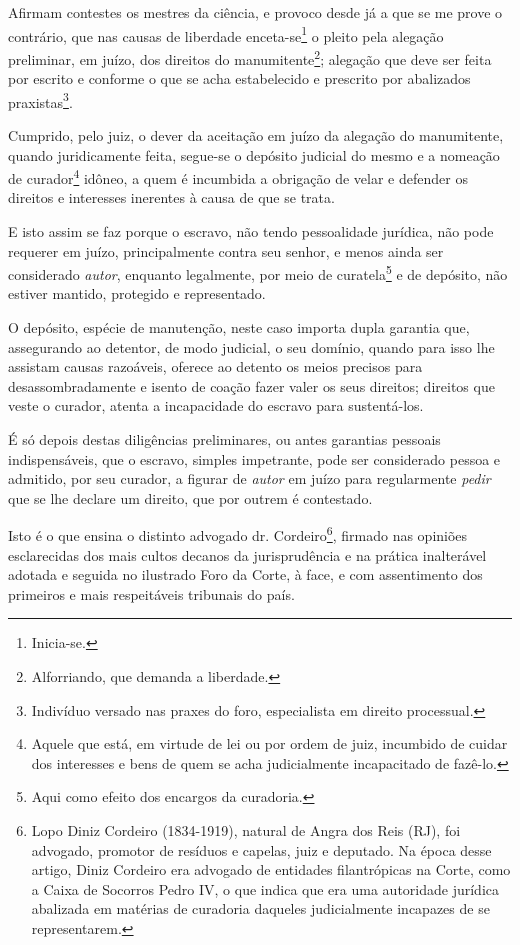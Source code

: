 \asterisc{}

Afirmam contestes os mestres da ciência, e provoco desde já a que se me
prove o contrário, que nas causas de liberdade enceta-se\footnote{
  Inicia-se.} o pleito pela alegação preliminar, em juízo, dos direitos
do manumitente\footnote{Alforriando, que demanda a liberdade.};
alegação que deve ser feita por escrito e conforme o que se acha
estabelecido e prescrito por abalizados praxistas\footnote{Indivíduo
  versado nas praxes do foro, especialista em direito processual.}.

Cumprido, pelo juiz, o dever da aceitação em juízo da alegação do
manumitente, quando juridicamente feita, segue-se o depósito judicial do
mesmo e a nomeação de curador\footnote{Aquele que está, em virtude de
  lei ou por ordem de juiz, incumbido de cuidar dos interesses e bens de
  quem se acha judicialmente incapacitado de fazê-lo.} idôneo, a quem é
incumbida a obrigação de velar e defender os direitos e interesses
inerentes à causa de que se trata.

E isto assim se faz porque o escravo, não tendo pessoalidade jurídica,
não pode requerer em juízo, principalmente contra seu senhor, e menos
ainda ser considerado \emph{autor}, enquanto legalmente, por meio de
curatela\footnote{Aqui como efeito dos encargos da curadoria.} e de
depósito, não estiver mantido, protegido e representado.

O depósito, espécie de manutenção, neste caso importa dupla garantia
que, assegurando ao detentor, de modo judicial, o seu domínio, quando
para isso lhe assistam causas razoáveis, oferece ao detento os meios
precisos para desassombradamente e isento de coação fazer valer os seus
direitos; direitos que veste o curador, atenta a incapacidade do escravo
para sustentá-los.

É só depois destas diligências preliminares, ou antes garantias pessoais
indispensáveis, que o escravo, simples impetrante, pode ser considerado
pessoa e admitido, por seu curador, a figurar de \emph{autor} em juízo
para regularmente \emph{pedir} que se lhe declare um direito, que por
outrem é contestado.

Isto é o que ensina o distinto advogado dr. Cordeiro\footnote{Lopo
  Diniz Cordeiro (1834-1919), natural de Angra dos Reis (RJ), foi
  advogado, promotor de resíduos e capelas, juiz e deputado. Na época
  desse artigo, Diniz Cordeiro era advogado de entidades filantrópicas
  na Corte, como a Caixa de Socorros Pedro IV, o que indica que era uma
  autoridade jurídica abalizada em matérias de curadoria daqueles
  judicialmente incapazes de se representarem.}, firmado nas opiniões
esclarecidas dos mais cultos decanos da jurisprudência e na prática
inalterável adotada e seguida no ilustrado Foro da Corte, à face, e com
assentimento dos primeiros e mais respeitáveis tribunais do país.

